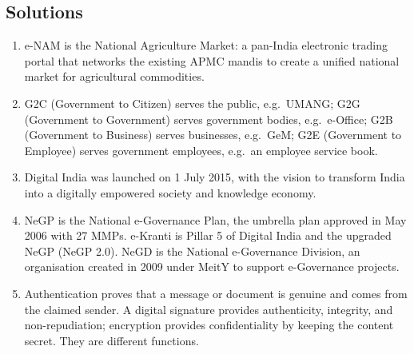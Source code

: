 \documentclass[11pt]{article}
\begin{document}
\subsection*{Solutions}
\begingroup\small
\begin{enumerate}[label=\arabic*.]
  \item e-NAM is the National Agriculture Market: a pan-India electronic
    trading portal that networks the existing APMC mandis to create a
    unified national market for agricultural commodities.
  \item G2C (Government to Citizen) serves the public, e.g.\ UMANG; G2G
    (Government to Government) serves government bodies, e.g.\ e-Office;
    G2B (Government to Business) serves businesses, e.g.\ GeM; G2E
    (Government to Employee) serves government employees, e.g.\ an employee
    service book.
  \item Digital India was launched on 1 July 2015, with the vision to
    transform India into a digitally empowered society and knowledge
    economy.
  \item NeGP is the National e-Governance Plan, the umbrella plan approved
    in May 2006 with 27 MMPs. e-Kranti is Pillar 5 of Digital India and the
    upgraded NeGP (NeGP 2.0). NeGD is the National e-Governance Division, an
    organisation created in 2009 under MeitY to support e-Governance
    projects.
  \item Authentication proves that a message or document is genuine and
    comes from the claimed sender. A digital signature provides authenticity,
    integrity, and non-repudiation; encryption provides confidentiality by
    keeping the content secret. They are different functions.
\end{enumerate}
\endgroup
\end{document}
